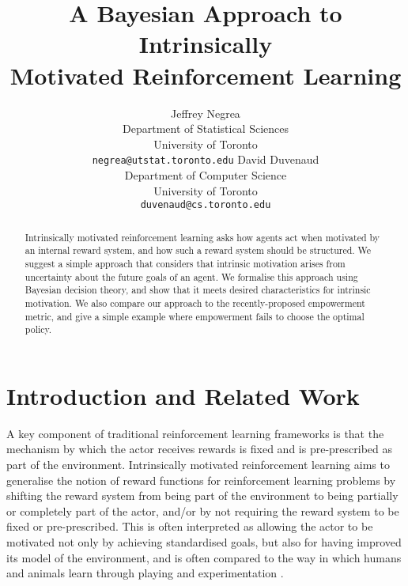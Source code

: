 \documentclass{article}
\title{A Bayesian Approach to Intrinsically\\Motivated Reinforcement Learning}
\author{
 Jeffrey Negrea\\
 Department of Statistical Sciences\\
 University of Toronto\\
 \texttt{negrea@utstat.toronto.edu}
 \And
 David Duvenaud\\
 Department of Computer Science\\
 University of Toronto\\
 \texttt{duvenaud@cs.toronto.edu}
}
\begin{document}
\maketitle

\begin{abstract}
Intrinsically motivated reinforcement learning asks how agents act when motivated by an internal reward system, and how such a reward system should be structured. 
We suggest a simple approach that considers that intrinsic motivation arises from uncertainty about the future goals of an agent.
We formalise this approach using Bayesian decision theory, and show that it meets desired characteristics for intrinsic motivation. 
We also compare our approach to the recently-proposed empowerment metric, and give a simple example where empowerment fails to choose the optimal policy.
\end{abstract}

\section{Introduction and Related Work}
A key component of traditional reinforcement learning frameworks is that the mechanism by which the actor receives rewards is fixed and is pre-prescribed as part of the environment.
Intrinsically motivated reinforcement learning aims to generalise the notion of reward functions for reinforcement learning problems by shifting the reward system from being part of the environment to being partially or completely part of the actor, and/or by not requiring the reward system to be fixed or pre-prescribed. This is often interpreted as allowing the actor to be motivated not only by achieving standardised goals, but also for having improved its model of the environment, and is often compared to the way in which humans and animals learn through playing and experimentation \citep{oudeyer2008can,schmidhuber2010formal}. 
\end{document}
